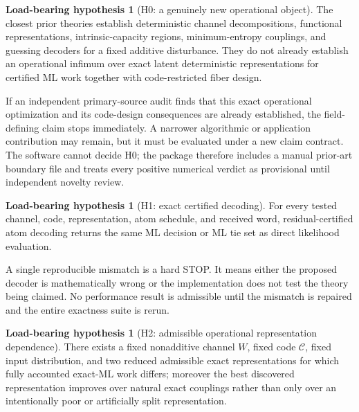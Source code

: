 \documentclass[11pt]{article}
\theoremstyle{definition}
\newtheorem{hypothesis}[theorem]{Load-bearing hypothesis}
\theoremstyle{remark}
\newcommand{\C}{\mathcal C}
\begin{document}
\begin{hypothesis}[H0: a genuinely new operational object]
The closest prior theories establish deterministic channel decompositions, functional representations, intrinsic-capacity regions, minimum-entropy couplings, and guessing decoders for a fixed additive disturbance. They do not already establish an operational infimum over exact latent deterministic representations for certified ML work together with code-restricted fiber design.
\label{hyp:H0}
\end{hypothesis}

\begin{stopbox}
If an independent primary-source audit finds that this exact operational optimization and its code-design consequences are already established, the field-defining claim stops immediately. A narrower algorithmic or application contribution may remain, but it must be evaluated under a new claim contract. The software cannot decide H0; the package therefore includes a manual prior-art boundary file and treats every positive numerical verdict as provisional until independent novelty review.
\end{stopbox}

\begin{hypothesis}[H1: exact certified decoding]
For every tested channel, code, representation, atom schedule, and received word, residual-certified atom decoding returns the same ML decision or ML tie set as direct likelihood evaluation.
\label{hyp:H1}
\end{hypothesis}

\begin{stopbox}
A single reproducible mismatch is a hard STOP. It means either the proposed decoder is mathematically wrong or the implementation does not test the theory being claimed. No performance result is admissible until the mismatch is repaired and the entire exactness suite is rerun.
\end{stopbox}

\begin{hypothesis}[H2: admissible operational representation dependence]
There exists a fixed nonadditive channel $W$, fixed code $\C$, fixed input distribution, and two reduced admissible exact representations for which fully accounted exact-ML work differs; moreover the best discovered representation improves over natural exact couplings rather than only over an intentionally poor or artificially split representation.
\label{hyp:H2}
\end{hypothesis}
\end{document}
